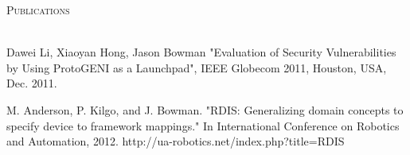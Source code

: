 \documentclass[10pt,letterpaper]{article}
\makeatletter
\newcommand{\lineunder}{\vspace*{-8pt} \\ \hspace*{-18pt} \hrulefill \\}
\newcommand{\header}[1]{{\hspace*{-15pt}\vspace*{6pt} \textsc{#1}} \vspace*{-6pt} \lineunder}
\newcommand{\headerrow}[2]
{\begin{tabular*}{\linewidth}{l@{\extracolsep{\fill}}r}
	#1 &
	#2 \\
\end{tabular*}}
\newcommand{\employment}[5]{
	\headerrow
		{\textbf{#1}}
		{\textbf{#2}}
	\\
	\headerrow
		{\emph{#3}}
		{\emph{#4}}
	\begin{itemize*}
		\item #5
	\end{itemize*}
}
\makeatother
\begin{document}

\vspace*{3pt}
\header{Publications}
\begin{itemize*}
\item Dawei Li, Xiaoyan Hong, Jason Bowman "Evaluation of Security Vulnerabilities by Using ProtoGENI as a Launchpad", IEEE Globecom 2011, Houston, USA, Dec. 2011.
\item M. Anderson, P. Kilgo, and J. Bowman. "RDIS: Generalizing domain concepts to specify device to framework mappings." In International Conference on Robotics and Automation, 2012. http://ua-robotics.net/index.php?title=RDIS
\end{itemize*}
\vspace*{8pt}

	
\end{document}
